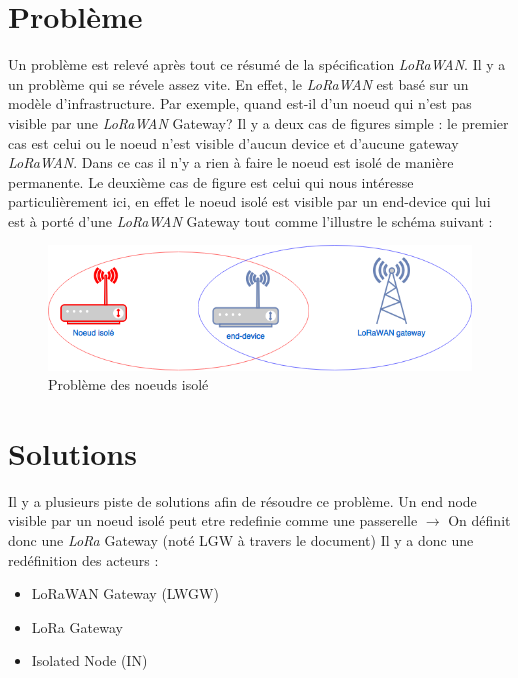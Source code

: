 \documentclass[11pt]{article}
\begin{document}
\newpage
\section{Problème}
Un problème est relevé après tout ce résumé de la spécification  \textit{LoRaWAN}. Il y a un problème qui se révele assez vite. En effet, le  \textit{LoRaWAN} est basé sur un modèle d'infrastructure. Par exemple, quand est-il d'un noeud qui n'est pas visible par une  \textit{LoRaWAN} Gateway? Il y a deux cas de figures simple : le premier cas est celui  ou le noeud n'est visible d'aucun device et d'aucune gateway  \textit{LoRaWAN}. Dans ce cas il n'y a rien à faire le noeud est isolé de manière permanente. Le deuxième cas de figure est celui qui nous intéresse particulièrement ici, en effet le noeud isolé est visible par un end-device qui lui est à porté d'une  \textit{LoRaWAN} Gateway tout comme l'illustre le schéma suivant :


\begin{figure}[h!]
\centering
\includegraphics[scale=0.6]{probleme.png} 
\caption{Problème des noeuds isolé}
\end{figure}

\newpage
\section{Solutions}
Il y a  plusieurs piste de solutions afin de résoudre ce problème. Un end node visible par un noeud isolé peut etre redefinie comme une passerelle $\rightarrow$ On définit donc une \textit{LoRa} Gateway (noté LGW à travers le document)
Il y a donc une redéfinition des acteurs :
\begin{itemize}
\item LoRaWAN Gateway (LWGW)
\item LoRa Gateway 
\item Isolated Node (IN)
\end{itemize}
\end{document}
